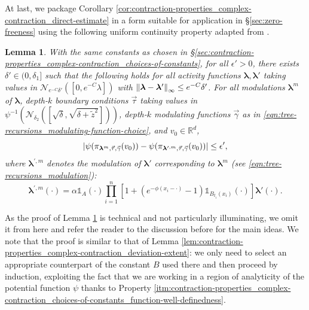 \documentclass[11pt]{article}
\newcommand{\R}{\mathbb R}
\newcommand{\bl}{\bm{\lambda}}
\newcommand{\tz}{\tilde{z}}
\newcommand{\lsconst}{C}
\newcommand{\indicator}[1]{\mathds{1}_{#1}}
\numberwithin{equation}{section}
\theoremstyle{plain}
\newtheorem{lemma}[theorem]{Lemma}
\theoremstyle{definition}
\theoremstyle{remark}
\begin{document}
At last, we package Corollary \ref{cor:contraction-properties_complex-contraction_direct-estimate} in a form suitable for application in \S\ref{sec:zero-freeness} using the following uniform continuity property adapted from \cite[Lemma 41]{michelen2023analyticity}.

\begin{lemma}
\label{lem:contraction-properties_complex-contraction_uniformly-continuous-tree-recursion}
With the same constants as chosen in \S\ref{sec:contraction-properties_complex-contraction_choices-of-constants}, for all $\epsilon'>0$, there exists $\delta'\in(0,\delta_{1}]$ such that the following holds for all activity functions $\bl,\bl'$ taking values in $\mathcal{N}_{e^{-\lsconst}\delta'}([0,e^{-\lsconst}\lambda])$ with $\norm{\bl-\bl'}_{\infty}\le e^{-\lsconst}\delta'$.
For all modulations $\bl^{m}$ of $\bl$, depth-$k$ boundary conditions $\vec{\tau}$ taking values in $\psi^{-1}(\mathcal{N}_{\delta_{2}}([\sqrt{\delta},\sqrt{\delta+\tz^{2}}]))$, depth-$k$ modulating functions $\vec{\gamma}$ as in \eqref{eqn:tree-recursions_modulating-function-choice}, and $v_{0}\in\R^{d}$, 
\begin{equation}
\abs{\psi(\pi_{\bl^{m},\vec{\tau},\vec{\gamma}}(v_{0}))-\psi(\pi_{\bl^{\prime,m},\vec{\tau},\vec{\gamma}}(v_{0}))}\le\epsilon',
\end{equation}
where $\bl^{\prime,m}$ denotes the modulation of $\bl'$ corresponding to $\bl^{m}$ (see \eqref{eqn:tree-recursions_modulation}):
\begin{equation}
\bl^{\prime,m}(\cdot)=\alpha\indicator{A}(\cdot)\prod_{i=1}^{n}\left[1+(e^{-\phi(x_{i}-\cdot)}-1)\indicator{B_{t_{i}}(x_{i})}(\cdot)\right]\bl'(\cdot).
\end{equation}
\end{lemma}

As the proof of Lemma \ref{lem:contraction-properties_complex-contraction_uniformly-continuous-tree-recursion} is technical and not particularly illuminating, we omit it from here and refer the reader to the discussion before \cite[Lemma 41]{michelen2023analyticity} for the main ideas.
We note that the proof is similar to that of Lemma \ref{lem:contraction-properties_complex-contraction_deviation-extent}: we only need to select an appropriate counterpart of the constant $B$ used there and then proceed by induction, exploiting the fact that we are working in a region of analyticity of the potential function $\psi$ thanks to Property \ref{itm:contraction-properties_complex-contraction_choices-of-constants_function-well-definedness}.
\end{document}
